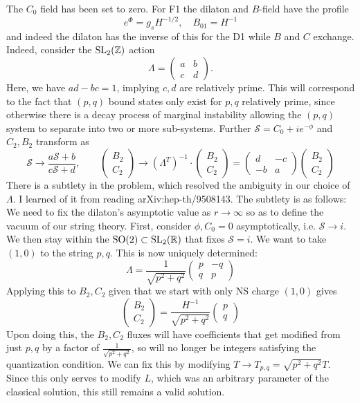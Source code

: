 \documentclass[11pt, class=article, crop=false]{standalone}
\begin{document}
\begin{enumerate}
	The $C_0$ field has been set to zero. For F1 the dilaton and $B$-field have the profile
	\[
		e^{\Phi} = g_s H^{-1/2}, \quad B_{01} = H^{-1}
	\]
	and indeed the dilaton has the inverse of this for the D1 while $B$ and $C$ exchange. Indeed, consider the $\mathrm{SL}_2(\mathbb{Z})$ action 
	\[
		\Lambda = \begin{pmatrix}
			a & b \\  c & d
		\end{pmatrix}.
	\]
	Here, we have $ad-bc = 1$, implying $c, d$ are relatively prime. This will correspond to the fact that $(p,q)$ bound states only exist for $p,q$ relatively prime, since otherwise there is a decay process of marginal instability allowing the $(p,q)$ system to separate into two or more sub-systems. Further $\mathcal S = C_0 + i e^{-\phi}$ and $C_2, B_2$ transform as
	\[
		\mathcal S \to \frac{a \mathcal S + b}{c \mathcal S + d}, \qquad \begin{pmatrix}
			B_2\\C_2
		\end{pmatrix} \to (\Lambda^T)^{-1} \cdot \begin{pmatrix}
			B_2 \\ C_2
		\end{pmatrix} = \begin{pmatrix}
			d & -c\\ -b & a
		\end{pmatrix}   \begin{pmatrix}
			B_2 \\ C_2
		\end{pmatrix}
	\]
	There is a subtlety in the problem, which resolved the ambiguity in our choice of $\Lambda$. I learned of it from reading arXiv:hep-th/9508143. The subtlety is as follows: We need to fix the dilaton's asymptotic value as $r \to \infty$ so as to define the vacuum of our string theory. First, consider $\phi, C_0 = 0$ asymptotically, i.e. $\mathcal S \to i$. We then stay within the $\mathrm{SO}(2) \subset  \mathrm{SL}_2(\mathbb{R})$ that fixes $\mathcal S = i$. We want to take $(1,0)$ to the string $p, q$. This is now uniquely determined:
	\[
		\Lambda = \frac{1}{\sqrt{p^2 + q^2}} \begin{pmatrix}
			p & -q\\
			q & p
		\end{pmatrix}
	\]
	Applying this to $B_2, C_2$ given that we start with only NS charge $(1,0)$ gives
	\[
		\begin{pmatrix}
					B_2\\ C_2
				\end{pmatrix} = \frac{H^{-1}}{\sqrt{p^2 + q^2}} \begin{pmatrix}
					p\\q
				\end{pmatrix}
	\]
	Upon doing this, the $B_2, C_2$ fluxes will have coefficients that get modified from just $p, q$ by a factor of $\frac{1}{\sqrt{p^2 + q^2}}$, so will no longer be integers satisfying the quantization condition. We can fix this by modifying $T \to T_{p,q} = \sqrt{p^2 + q^2} T$. Since this only serves to modify $L$, which was an arbitrary parameter of the classical solution, this still remains a valid solution.
	

\end{enumerate}
\end{document}
